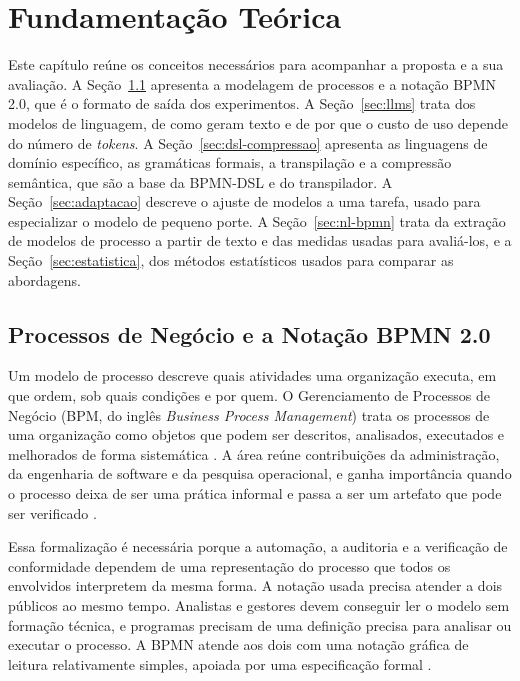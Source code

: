 \chapter{Fundamentação Teórica}
\label{cap:fundamentacao-teorica}

Este capítulo reúne os conceitos necessários para acompanhar a proposta e a sua avaliação. A Seção~\ref{sec:bpmn} apresenta a modelagem de processos e a notação BPMN 2.0, que é o formato de saída dos experimentos. A Seção~\ref{sec:llms} trata dos modelos de linguagem, de como geram texto e de por que o custo de uso depende do número de \textit{tokens}. A Seção~\ref{sec:dsl-compressao} apresenta as linguagens de domínio específico, as gramáticas formais, a transpilação e a compressão semântica, que são a base da BPMN-DSL e do transpilador. A Seção~\ref{sec:adaptacao} descreve o ajuste de modelos a uma tarefa, usado para especializar o modelo de pequeno porte. A Seção~\ref{sec:nl-bpmn} trata da extração de modelos de processo a partir de texto e das medidas usadas para avaliá-los, e a Seção~\ref{sec:estatistica}, dos métodos estatísticos usados para comparar as abordagens.

\section{Processos de Negócio e a Notação BPMN 2.0}
\label{sec:bpmn}\label{subsec:bpm}\label{subsec:bpmn-notacao}\label{subsec:bpmn-xml}

Um modelo de processo descreve quais atividades uma organização executa, em que ordem, sob quais condições e por quem. O Gerenciamento de Processos de Negócio (BPM, do inglês \textit{Business Process Management}) trata os processos de uma organização como objetos que podem ser descritos, analisados, executados e melhorados de forma sistemática \cite{dumas2018fundamentals}. A área reúne contribuições da administração, da engenharia de software e da pesquisa operacional, e ganha importância quando o processo deixa de ser uma prática informal e passa a ser um artefato que pode ser verificado \cite{weske2019business}.

Essa formalização é necessária porque a automação, a auditoria e a verificação de conformidade dependem de uma representação do processo que todos os envolvidos interpretem da mesma forma. A notação usada precisa atender a dois públicos ao mesmo tempo. Analistas e gestores devem conseguir ler o modelo sem formação técnica, e programas precisam de uma definição precisa para analisar ou executar o processo. A BPMN atende aos dois com uma notação gráfica de leitura relativamente simples, apoiada por uma especificação formal \cite{omg2011bpmn}.

